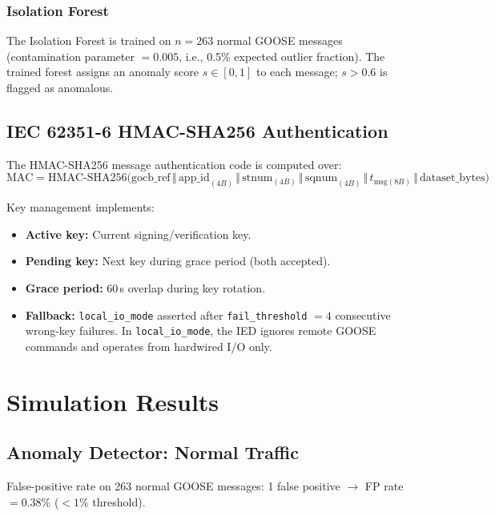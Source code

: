 \documentclass[11pt, a4paper]{article}
\newcommand{\cmark}{\ding{51}}
\begin{document}
\subsubsection{Isolation Forest}

The Isolation Forest is trained on $n = 263$ normal GOOSE messages
(contamination parameter $= 0.005$, i.e., 0.5\% expected outlier fraction).
The trained forest assigns an anomaly score $s \in [0, 1]$ to each message;
$s > 0.6$ is flagged as anomalous.

\subsection{IEC 62351-6 HMAC-SHA256 Authentication}

The HMAC-SHA256 message authentication code is computed over:
\begin{equation}
  \mathrm{MAC} = \mathrm{HMAC\text{-}SHA256}\bigl(
    \text{gocb\_ref} \,\Vert\,
    \text{app\_id}_{(4B)} \,\Vert\,
    \text{stnum}_{(4B)} \,\Vert\,
    \text{sqnum}_{(4B)} \,\Vert\,
    t_{\mathrm{msg}(8B)} \,\Vert\,
    \text{dataset\_bytes}
  \bigr)
  \label{eq:hmac}
\end{equation}

Key management implements:
\begin{itemize}
  \item \textbf{Active key:} Current signing/verification key.
  \item \textbf{Pending key:} Next key during grace period (both accepted).
  \item \textbf{Grace period:} 60\,s overlap during key rotation.
  \item \textbf{Fallback:} \texttt{local\_io\_mode} asserted after
    \texttt{fail\_threshold} $= 4$ consecutive wrong-key failures.
    In \texttt{local\_io\_mode}, the IED ignores remote GOOSE commands
    and operates from hardwired I/O only.
\end{itemize}

\section{Simulation Results}
\label{sec:results}

\subsection{Anomaly Detector: Normal Traffic}

False-positive rate on 263 normal GOOSE messages:
1 false positive $\to$ FP rate $= 0.38\%$ ($< 1\%$ threshold). \cmark
\end{document}
